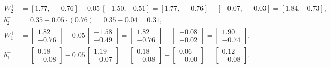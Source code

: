 \documentclass[11pt]{article}
\begin{document}
\begin{align*}
W_2^+&=[1.77,\ -0.76]-0.05\,[-1.50, -0.51]=[1.77,\ -0.76]-[-0.07,\ -0.03]=[1.84, -0.73],\\
b_2^+&=0.35-0.05\cdot(0.76)=0.35-0.04=0.31,\\
W_1^+&=\begin{bmatrix}1.82\\-0.76\end{bmatrix}-0.05\,\begin{bmatrix}-1.58\\-0.49\end{bmatrix}=\begin{bmatrix}1.82\\-0.76\end{bmatrix}-\begin{bmatrix}-0.08\\-0.02\end{bmatrix}=\begin{bmatrix}1.90\\-0.74\end{bmatrix},\\
b_1^+&=\begin{bmatrix}0.18\\-0.08\end{bmatrix}-0.05\,\begin{bmatrix}1.19\\-0.07\end{bmatrix}=\begin{bmatrix}0.18\\-0.08\end{bmatrix}-\begin{bmatrix}0.06\\-0.00\end{bmatrix}=\begin{bmatrix}0.12\\-0.08\end{bmatrix}.
\end{align*}
\end{document}
